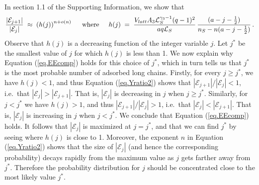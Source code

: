 \documentclass[journal=mamobx,manuscript=article]{achemso}
\newcommand{\leng}{\mathcal{L}}
\begin{document}
In section 1.1 of the Supporting Information, we show that
\begin{equation}
    \label{eq.Yratio2}
       \frac{|\mathcal{E}_{j+1}|}{|\mathcal{E}_j|} \; \approx \; \left( h(j)\right)^{n+o(n)}
       \hspace{5mm}\hbox{where}\hspace{5mm}
      h(j) \;=\;  \frac{ V_{latt}A_3\leng_S^{\gamma_3-1}(q-1)^2}{aq\leng_S} \,
          \frac{(a-j-\frac{1}{2})}{n_S-n(a-j-\frac{1}{2})}   \,.
\end{equation}
Observe that $h(j)$ is a  decreasing function of the integer variable $j$.
Let $j^*$ be the smallest value of $j$ for which 
$h(j)$ is less than 1. 
We now explain why Equation (\ref{eq.EEcomp}) holds 
for this choice of $j^*$, which in turn tells us that
$j^*$ is the most probable 
number of adsorbed long chains.
Firstly, for every $j\geq j^*$, we have $h(j)<1$, 
and thus Equation (\ref{eq.Yratio2}) shows that 
$|\mathcal{E}_{j+1}|/|\mathcal{E}_j|<1$, i.e.\ that 
$|\mathcal{E}_j|>|\mathcal{E}_{j+1}|$.  That is, $|\mathcal{E}_j|$ is decreasing in $j$ when $j\geq j^*$.  
Similarly, for $j<j^*$ we have $h(j)>1$, and thus
$|\mathcal{E}_{j+1}|/|\mathcal{E}_j|> 1$, i.e.\ that
$|\mathcal{E}_j|<|\mathcal{E}_{j+1}|$.  That is, $|\mathcal{E}_j|$ is increasing in $j$ when $j< j^*$.
We conclude that Equation (\ref{eq.EEcomp}) holds.
It follows that $|\mathcal{E}_j|$ is maximized at $j=j^*$, and that we can find $j^*$ by seeing 
where $h(j)$
is close to 1.   
Moreover, the exponent $n$ in Equation (\ref{eq.Yratio2})
shows that the size of $|\mathcal{E}_j|$ (and hence the 
corresponding probability) decays rapidly from the maximum 
value as $j$ gets farther away from $j^*$.  Therefore the probability distribution for $j$ should be concentrated close to the most likely value $j^*$.
\end{document}
